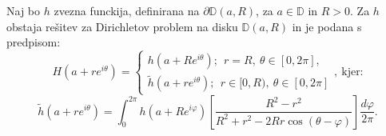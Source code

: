 \documentclass[mat1]{fmfdelo}
\begin{document}
    \begin{trditev}
        \label{alldisk}
        Naj bo $h$ zvezna funckija, definirana na $\partial \mathbb{D}(a,R)$, za $a \in \mathbb{D}$ in $R>0$.  
        Za $h$ obstaja rešitev za Dirichletov problem na disku $\mathbb{D}(a,R)$ in je podana s predpisom:
        $$
            H(a + r e^{i \theta}) = \begin{cases}
                    h(a + R e^{i \theta});~~r = R,~\theta \in [0, 2\pi],\\
                    \widetilde{h}(a + r e^{i \theta});~~ r \in [0,R),~ \theta \in [0, 2\pi]
            \end{cases},~\text{kjer:}
        $$
        $$
        \widetilde{h}(a + r e^{i \theta}) = \int_{0}^{2 \pi}{h(a + R e^{i \varphi}) \left[\frac{R^2 - r^2}{R^2 + r^2 - 2Rr \cos(\theta - \varphi)}\right] \frac{d \varphi}{2 \pi}}.
        $$
     \end{trditev}
\end{document}

